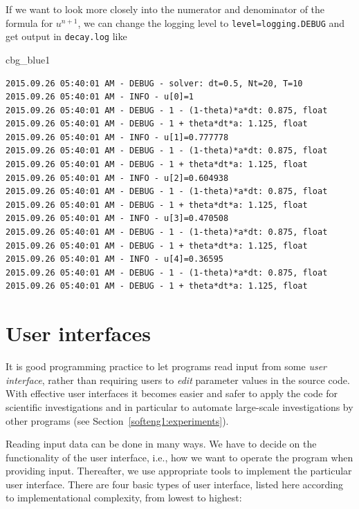 \documentclass[%
oneside,                 %
final,                   %
10pt]{article}
\newenvironment{_cod_tight}[1]{
   \def\FrameCommand{\colorbox{#1}}
   \FrameRule0.6pt\MakeFramed {\FrameRestore}\vskip3mm}
   {\vskip0mm\endMakeFramed}
\newenvironment{cod}[1]{
\bgroup\rmfamily
\fboxsep=0mm\relax
\begin{_cod_tight}{#1}
\list{}{\parsep=-2mm\parskip=0mm\topsep=0pt\leftmargin=2mm
\rightmargin=2\leftmargin\leftmargin=4pt\relax}
\item\relax}
{\endlist\end{_cod_tight}\egroup}
\begin{document}
If we want to look more closely into the numerator and denominator of
the formula for $u^{n+1}$, we can change the logging level to
\texttt{level=logging.DEBUG} and get output in \texttt{decay.log} like

\begin{cod}{cbg_blue1}\begin{Verbatim}[numbers=none,fontsize=\fontsize{9pt}{9pt},baselinestretch=0.95,xleftmargin=2mm]
2015.09.26 05:40:01 AM - DEBUG - solver: dt=0.5, Nt=20, T=10
2015.09.26 05:40:01 AM - INFO - u[0]=1
2015.09.26 05:40:01 AM - DEBUG - 1 - (1-theta)*a*dt: 0.875, float
2015.09.26 05:40:01 AM - DEBUG - 1 + theta*dt*a: 1.125, float
2015.09.26 05:40:01 AM - INFO - u[1]=0.777778
2015.09.26 05:40:01 AM - DEBUG - 1 - (1-theta)*a*dt: 0.875, float
2015.09.26 05:40:01 AM - DEBUG - 1 + theta*dt*a: 1.125, float
2015.09.26 05:40:01 AM - INFO - u[2]=0.604938
2015.09.26 05:40:01 AM - DEBUG - 1 - (1-theta)*a*dt: 0.875, float
2015.09.26 05:40:01 AM - DEBUG - 1 + theta*dt*a: 1.125, float
2015.09.26 05:40:01 AM - INFO - u[3]=0.470508
2015.09.26 05:40:01 AM - DEBUG - 1 - (1-theta)*a*dt: 0.875, float
2015.09.26 05:40:01 AM - DEBUG - 1 + theta*dt*a: 1.125, float
2015.09.26 05:40:01 AM - INFO - u[4]=0.36595
2015.09.26 05:40:01 AM - DEBUG - 1 - (1-theta)*a*dt: 0.875, float
2015.09.26 05:40:01 AM - DEBUG - 1 + theta*dt*a: 1.125, float
\end{Verbatim}
\end{cod}
\noindent


\section{User interfaces}
\label{softeng1:basic:UI}

It is good programming practice to let programs read input from
some \emph{user interface}, rather than requiring users to \emph{edit}
parameter values in the source code. With effective user interfaces
it becomes easier and safer to apply the code for scientific investigations and
in particular to automate large-scale investigations by other programs
(see Section~\ref{softeng1:experiments}).

Reading input data can be done in many ways. We have to decide on the
functionality of the user interface, i.e., how we want to operate the
program when providing input. Thereafter, we use appropriate tools to
implement the particular user interface. There are four basic types
of user interface, listed here according to implementational
complexity, from lowest to highest:
\end{document}
